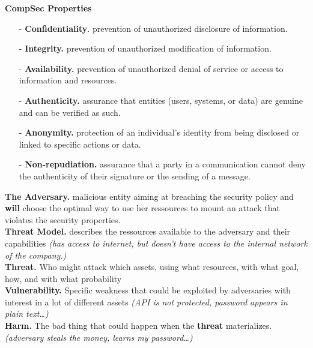 \documentclass[8pt]{article}
\begin{document}
\vspace*{-20px}
\noindent
\begin{minipage}[t]{0.49\textwidth}
	\noindent\textbf{CompSec Properties}
	\begin{itemize}
		\item[-] \textbf{Confidentiality}. prevention of unauthorized disclosure of information.
		\item[-] \textbf{Integrity.} prevention of unauthorized modification of information.
		\item[-] \textbf{Availability.} prevention of unauthorized denial of service or access to information and resources.
		\item[-] \textbf{Authenticity.} assurance that entities (users, systems, or data) are genuine and can be verified as such.
		\item[-] \textbf{Anonymity.} protection of an individual's identity from being disclosed or linked to specific actions or data.
		\item[-] \textbf{Non-repudiation.} assurance that a party in a communication cannot deny the authenticity of their signature or the sending of a message.
	\end{itemize}
	\noindent\textbf{The Adversary.} malicious entity aiming at breaching the security policy and \textbf{will} choose the optimal way to use her ressources to mount an attack that violates the security properties.\\
	\noindent \textbf{Threat Model.} describes the ressources available to the adversary and their capabilities \textit{(has access to internet, but doesn't have access to the internal network of the company.)}\\
	\noindent \textbf{Threat.} Who might attack which assets, using what resources, with what goal, how, and with what probability\\
	\noindent \textbf{Vulnerability.} Specific weakness that could be exploited by adversaries with interest in a lot of different assets \textit{(API is not protected, password appears in plain text\dots)}\\
	\noindent \textbf{Harm.} The bad thing that could happen when the \textbf{threat} materializes. \textit{(adversary steals the money, learns my password\dots)}
\end{minipage}
\hfill
\noindent
\end{document}

